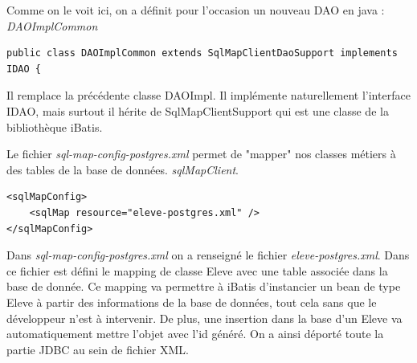 \documentclass[a4paper,12pt]{article}
\begin{document}
Comme on le voit ici, on a définit pour l'occasion un nouveau DAO en java : \textit{DAOImplCommon}

\begin{lstlisting}
public class DAOImplCommon extends SqlMapClientDaoSupport implements IDAO {
\end{lstlisting}

Il remplace la précédente classe DAOImpl.
Il implémente naturellement l'interface IDAO, mais surtout il hérite de SqlMapClientSupport qui est une classe de la bibliothèque iBatis.


Le fichier  \textit{sql-map-config-postgres.xml} permet de "mapper" nos classes métiers à des tables de la base de données.
\textit{sqlMapClient}. 

\begin{lstlisting}
<sqlMapConfig>
	<sqlMap resource="eleve-postgres.xml" />
</sqlMapConfig>
\end{lstlisting}

Dans \textit{sql-map-config-postgres.xml} on a renseigné le fichier \textit{eleve-postgres.xml}. Dans ce fichier est défini le mapping de classe Eleve avec une table associée dans la base de donnée. Ce mapping va permettre à iBatis d'instancier un bean de type Eleve à partir des informations de la base de données, tout cela sans que le développeur n'est à intervenir. De plus, une insertion dans la base d'un Eleve va automatiquement mettre l'objet avec l'id généré.
On a ainsi déporté toute la partie JDBC au sein de fichier XML.
\end{document}
